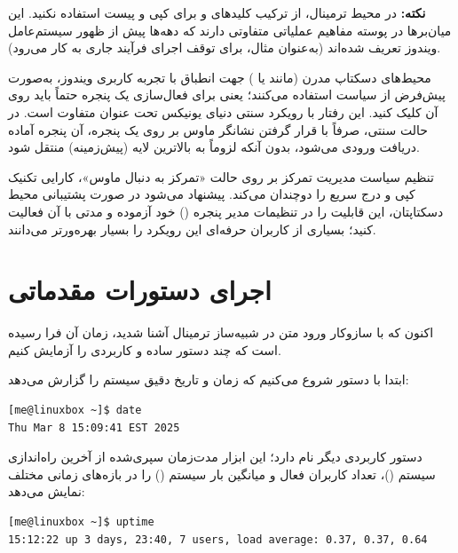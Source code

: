 \begin{warning}
\textbf{نکته:} در محیط ترمینال، از ترکیب کلیدهای  و  برای کپی و پیست استفاده نکنید. این میان‌برها در پوسته مفاهیم عملیاتی متفاوتی دارند که دهه‌ها پیش از ظهور سیستم‌عامل ویندوز تعریف شده‌اند (به‌عنوان مثال،  برای توقف اجرای فرآیند جاری به کار می‌رود).
\end{warning}

محیط‌های دسکتاپ مدرن (مانند  یا ) جهت انطباق با تجربه کاربری ویندوز، به‌صورت پیش‌فرض از سیاست  استفاده می‌کنند؛ یعنی برای فعال‌سازی یک پنجره حتماً باید روی آن کلیک کنید. این رفتار با رویکرد سنتی دنیای یونیکس تحت عنوان  متفاوت است. در حالت سنتی، صرفاً با قرار گرفتن نشانگر ماوس بر روی یک پنجره، آن پنجره آماده دریافت ورودی می‌شود، بدون آنکه لزوماً به بالاترین لایه (پیش‌زمینه) منتقل شود.

تنظیم سیاست مدیریت تمرکز بر روی حالت «تمرکز به دنبال ماوس»، کارایی تکنیک کپی و درج سریع را دوچندان می‌کند. پیشنهاد می‌شود در صورت پشتیبانی محیط دسکتاپتان، این قابلیت را در تنظیمات مدیر پنجره () خود آزموده و مدتی با آن فعالیت کنید؛ بسیاری از کاربران حرفه‌ای این رویکرد را بسیار بهره‌ورتر می‌دانند.

\section{اجرای دستورات مقدماتی}

اکنون که با سازوکار ورود متن در شبیه‌ساز ترمینال آشنا شدید، زمان آن فرا رسیده است که چند دستور ساده و کاربردی را آزمایش کنیم.

ابتدا با دستور  شروع می‌کنیم که زمان و تاریخ دقیق سیستم را گزارش می‌دهد:

\begin{latin}
\begin{lstlisting}
[me@linuxbox ~]$ date
Thu Mar 8 15:09:41 EST 2025
\end{lstlisting}
\end{latin}

دستور کاربردی دیگر  نام دارد؛ این ابزار مدت‌زمان سپری‌شده از آخرین راه‌اندازی سیستم ()، تعداد کاربران فعال و میانگین بار سیستم () را در بازه‌های زمانی مختلف نمایش می‌دهد:

\begin{latin}
\begin{lstlisting}
[me@linuxbox ~]$ uptime
15:12:22 up 3 days, 23:40, 7 users, load average: 0.37, 0.37, 0.64
\end{lstlisting}
\end{latin}

